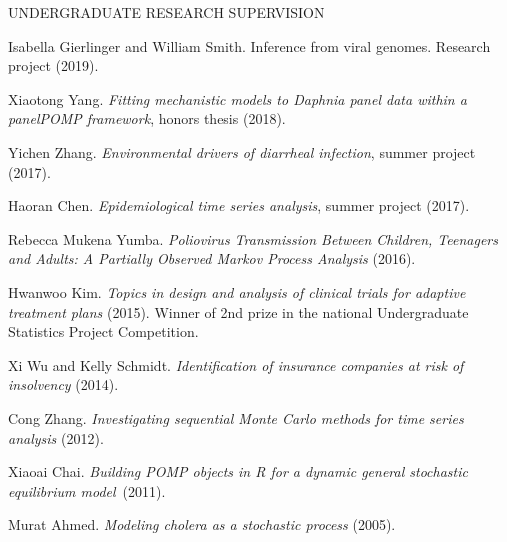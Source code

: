 \begin{reflist}{UNDERGRADUATE RESEARCH SUPERVISION}
  \item{Isabella Gierlinger and William Smith}. Inference from viral genomes. Research project (2019).
  \item{Xiaotong Yang}. {\em Fitting mechanistic models to Daphnia panel data within a panelPOMP framework}, honors thesis (2018).
\item{Yichen Zhang}. {\em Environmental drivers of diarrheal infection}, summer project (2017).
\item{Haoran Chen}. {\em Epidemiological time series analysis}, summer project (2017).
\item{Rebecca Mukena Yumba}.  {\em Poliovirus Transmission Between Children, Teenagers and Adults: A Partially Observed Markov Process Analysis} (2016).
\item{Hwanwoo Kim}. {\em Topics in design and analysis of clinical trials for adaptive treatment plans} (2015). Winner of 2nd prize in the national Undergraduate Statistics Project Competition.
\item{Xi Wu and Kelly Schmidt}. {\em Identification of insurance companies at risk of insolvency} (2014).
\item{Cong Zhang}. {\em Investigating sequential Monte Carlo methods for time series analysis} (2012).
\item{Xiaoai Chai}. {\em Building POMP objects in R for a dynamic general stochastic equilibrium model}~(2011).  
\item{Murat Ahmed}. {\em Modeling cholera as a stochastic process} (2005).

\end{reflist}



\lsp


